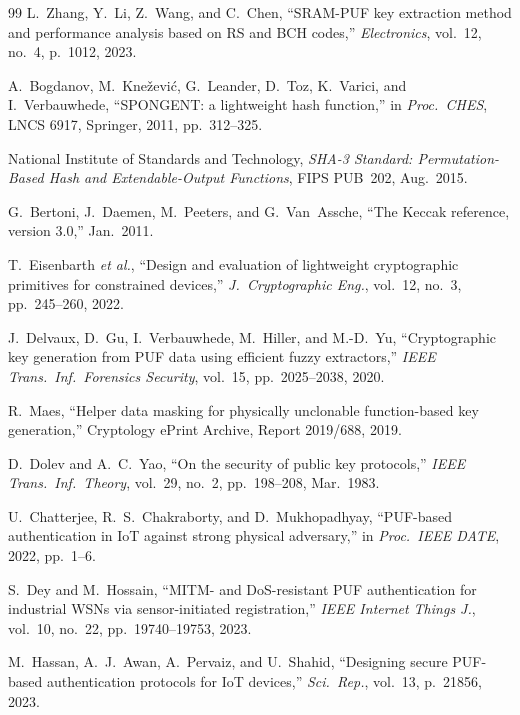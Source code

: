 \documentclass[journal,a4paper,10pt]{IEEEtran}
\begin{document}
\begin{thebibliography}{99}
 L.~Zhang, Y.~Li, Z.~Wang, and C.~Chen,
``SRAM-PUF key extraction method and performance analysis based on RS
and BCH codes,'' \emph{Electronics}, vol.~12, no.~4, p.~1012, 2023.

 A.~Bogdanov, M.~Kne\v{z}evi\'c,
G.~Leander, D.~Toz, K.~Varici, and I.~Verbauwhede, ``SPONGENT: a
lightweight hash function,'' in \emph{Proc.\ CHES}, LNCS 6917,
Springer, 2011, pp.~312--325.

 National Institute of Standards and
Technology, \emph{SHA-3 Standard: Permutation-Based Hash and
Extendable-Output Functions}, FIPS PUB~202, Aug.~2015.

 G.~Bertoni, J.~Daemen, M.~Peeters, and
G.~Van~Assche, ``The Keccak reference, version 3.0,'' Jan.~2011.

 T.~Eisenbarth \textit{et al.},
``Design and evaluation of lightweight cryptographic primitives for
constrained devices,'' \emph{J.\ Cryptographic Eng.}, vol.~12, no.~3,
pp.~245--260, 2022.

 J.~Delvaux, D.~Gu, I.~Verbauwhede,
M.~Hiller, and M.-D.~Yu, ``Cryptographic key generation from PUF data
using efficient fuzzy extractors,'' \emph{IEEE Trans.\ Inf.\ Forensics
Security}, vol.~15, pp.~2025--2038, 2020.

 R.~Maes, ``Helper data masking for
physically unclonable function-based key generation,'' Cryptology
ePrint Archive, Report 2019/688, 2019.

 D.~Dolev and A.~C.~Yao, ``On the security of
public key protocols,'' \emph{IEEE Trans.\ Inf.\ Theory}, vol.~29,
no.~2, pp.~198--208, Mar.~1983.

 U.~Chatterjee, R.~S.~Chakraborty,
and D.~Mukhopadhyay, ``PUF-based authentication in IoT against strong
physical adversary,'' in \emph{Proc.\ IEEE DATE}, 2022, pp.~1--6.

 S.~Dey and M.~Hossain, ``MITM- and DoS-resistant
PUF authentication for industrial WSNs via sensor-initiated
registration,'' \emph{IEEE Internet Things J.}, vol.~10, no.~22,
pp.~19740--19753, 2023.

 M.~Hassan, A.~J.~Awan, A.~Pervaiz, and
U.~Shahid, ``Designing secure PUF-based authentication protocols for
IoT devices,'' \emph{Sci.\ Rep.}, vol.~13, p.~21856, 2023.


\end{thebibliography}
\end{document}
